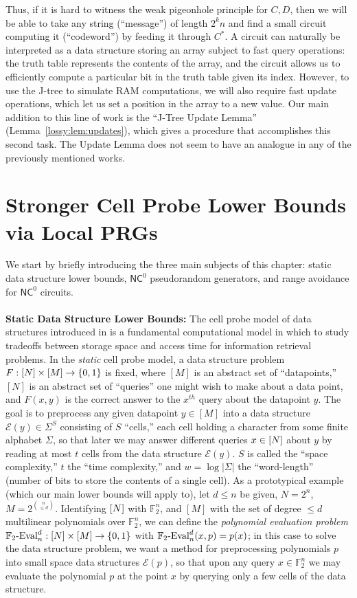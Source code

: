 Thus, if it is hard to witness the weak pigeonhole principle for $C,D$, then we will be able to take any string (``message'') of length $2^kn$ and find a small circuit computing it (``codeword'') by feeding it through $C^*$. A circuit can naturally be interpreted as a data structure storing an array subject to fast query operations: the truth table represents the contents of the array, and the circuit allows us to efficiently compute a particular bit in the truth table given its index. However, to use the J-tree to simulate RAM computations, we will also require fast update operations, which let  us set a position in the array to a new value. Our main addition to this line of work is the ``J-Tree Update Lemma'' (Lemma~\ref{lossy:lem:updates}), which gives a procedure that accomplishes this second task. The Update Lemma does not seem to have an analogue in any of the previously mentioned works.

\section{Stronger Cell Probe Lower Bounds via Local PRGs}
We start by briefly introducing the three main subjects of this chapter: static data structure lower bounds, $\mathsf{NC}^0$ pseudorandom generators, and range avoidance for $\mathsf{NC}^0$ circuits. 
~\\~\\
{\bf \noindent Static Data Structure Lower Bounds:} 
The cell probe model of data structures introduced in \cite{eliasflower,Yao} is a fundamental computational model in which to study tradeoffs between storage space and access time for information retrieval problems. In the \emph{static} cell probe model, a data structure problem $F: [N] \times [M] \to \{0,1\}$ is fixed, where $[M]$ is an abstract set of ``datapoints,'' $[N]$ is an abstract set of ``queries'' one might wish to make about a data point, and $F(x,y)$ is the correct answer to the $x^{th}$ query about the datapoint $y$. The goal is to preprocess any given datapoint $y\in [M]$ into a data structure $\mathcal{E}(y) \in \Sigma^S$ consisting of $S$ ``cells,'' each cell holding a character from some finite alphabet $\Sigma$, so that later we may answer different queries $x \in [N]$ about $y$ by reading at most $t$ cells from the data structure $\mathcal{E}(y)$. $S$ is called the ``space complexity,'' $t$ the ``time complexity,'' and $w=\log|\Sigma|$ the ``word-length'' (number of bits to store the contents of a single cell).
As a prototypical example (which our main lower bounds will apply to), let $d \leq n$ be given, $N=2^n$, $M = 2^{\binom{n}{\leq d}}$. Identifying $[N]$ with $\mathbb{F}_2^n$, and $[M]$ with the set of degree $\leq d$ multilinear polynomials over $\mathbb{F}_2^n$, we can define the \emph{polynomial evaluation problem} $\mathbb{F}_2\text{-}\mathrm{Eval}_n^d:[N] \times [M] \to \{0,1\}$ with $\mathbb{F}_2\text{-}\mathrm{Eval}_n^d(x,p)=p(x)$; in this case to solve the data structure problem, we want a method for preprocessing polynomials $p$ into small space data structures $\mathcal{E}(p)$, so that upon any query $x \in \mathbb{F}_2^n$ we may evaluate the polynomial $p$ at the point $x$ by querying only a few cells of the data structure.

